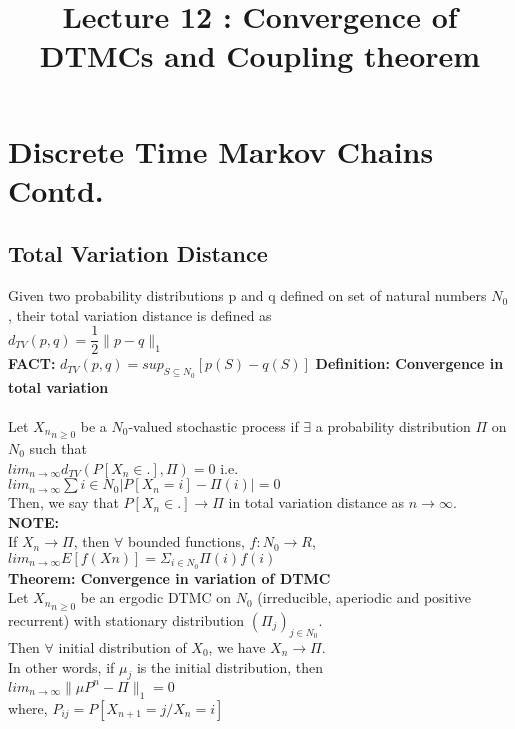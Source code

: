 \documentclass[a4paper,10pt,english]{article}
\title{Lecture 12 : Convergence of DTMCs and Coupling theorem}
\author{}
\begin{document}
\maketitle
\section{Discrete Time Markov Chains Contd.}

\subsection{Total Variation Distance}

Given two probability distributions p and q defined on set of natural numbers \textbf{$N_0$}, their total variation distance is defined as\\
$d_{TV}(p,q) = \dfrac{1}{2} \lVert p - q \rVert_1$\\
\textbf{FACT:} $d_{TV}(p,q) = sup_{S \subseteq N_0} [p(S) - q(S)]$
\textbf{Definition: Convergence in total variation\\}\\
Let ${X_n}_{n \geq 0}$ be a $N_0$-valued stochastic process if $\exists$ a probability distribution $\Pi$ on $N_0$ such that \\
$lim_{n \rightarrow \infty} d_{TV}(P[X_{n} \in .], \Pi) = 0$ i.e.\\

$lim_{n \rightarrow \infty} \sum{i \in N_{0}} \lvert P[X_{n}=i] - \Pi(i) \rvert = 0$\\
Then, we say that $P[X_{n} \in .] \rightarrow \Pi$ in total variation distance as $n \rightarrow \infty$.\\
\textbf{NOTE:}\\
If $X_{n} \rightarrow \Pi$, then $\forall$ bounded functions, $f:N_{0} \rightarrow R$, $lim_{n \rightarrow \infty} E[f(X{n})] = \Sigma_{i \in N_0} \Pi(i)f(i)$\\
\textbf{Theorem: Convergence in variation of DTMC}\\
Let ${X_n}_{n \geq 0}$ be an ergodic DTMC on $N_{0}$ (irreducible, aperiodic and positive recurrent) with stationary distribution $(\Pi_{j})_{j \in N_0}$.\\
Then $\forall$ initial distribution of $X_0$, we have $X_n \rightarrow \Pi$.\\
In other words, if $\mu_j$ is the initial distribution, then \\

 $lim_{n \rightarrow \infty} \lVert \mu P^n - \Pi \rVert_1 = 0$\\
 where, $P_{ij} = P[X_{n+1} = j/X_n = i]$\\
\end{document}
